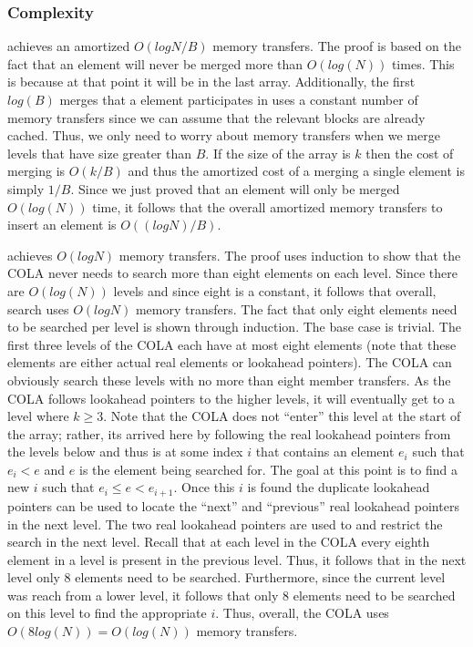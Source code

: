 \documentclass{style}
\begin{document}
\subsubsection{Complexity}

\Insert{} achieves an amortized $O(log N / B)$ memory transfers. The proof is
based on the fact that an element will never be merged more than $O(log(N))$
times. This is because at that point it will be in the last array.
Additionally, the first $log(B)$ merges that a element participates in uses a
constant number of memory transfers since we can assume that the relevant
blocks are already cached. Thus, we only need to worry about memory transfers
when we merge levels that have size greater than $B$. If the size of the array
is $k$ then the cost of merging is $O(k/B)$ and thus the amortized cost of a
merging a single element is simply $1/B$. Since we just proved that an element
will only be merged $O(log(N))$ time, it follows that the overall amortized
memory transfers to insert an element is $O((log N)/B)$.

\Search{} achieves $O(log N)$ memory transfers. The proof uses induction to
show that the COLA never needs to search more than eight elements on each
level. Since there are $O(log(N))$ levels and since eight is a constant, it
follows that overall, search uses $O(log N)$ memory transfers. The fact that
only eight elements need to be searched per level is shown through induction.
The base case is trivial. The first three levels of the COLA each have at most
eight elements (note that these elements are either actual real elements or
lookahead pointers). The COLA can obviously search these levels with no more
than eight member transfers. As the COLA follows lookahead pointers to the
higher levels, it will eventually get to a level where $k \geq 3$. Note that
the COLA does not ``enter'' this level at the start of the array; rather, its
arrived here by following the real lookahead pointers from the levels below
and thus is at some index $i$ that contains an element $e_i$ such that $e_i <
e$ and $e$ is the element being searched for. The goal at this point is to
find a new $i$ such that $e_i \leq e < e_{i+1}$. Once this $i$ is found the
duplicate lookahead pointers can be used to locate the ``next'' and
``previous'' real lookahead pointers in the next level. The two real lookahead
pointers are used to and restrict the search in the next level. Recall that at
each level in the COLA every eighth element in a level is present in the
previous level. Thus, it follows that in the next level only 8 elements need
to be searched. Furthermore, since the current level was reach from a lower
level, it follows that only 8 elements need to be searched on this level to
find the appropriate $i$. Thus, overall, the COLA uses $O(8log(N)) =
O(log(N))$ memory transfers.
\end{document}
